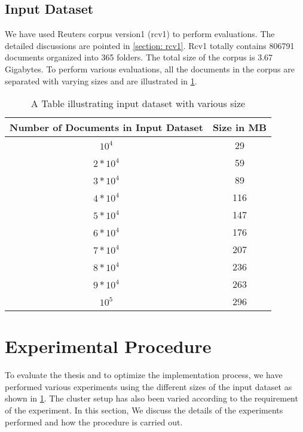 \subsection{Input Dataset}
\label{section: input dataset}
We have used Reuters corpus version1 (rcv1) to perform evaluations. The detailed discussions are pointed in \ref{section: rcv1}. Rcv1 totally contains 806791 documents organized into 365 folders. The total size of the corpus is 3.67 Gigabytes. To perform various evaluations, all the documents in the corpus are separated with varying sizes and are illustrated in \ref{tab:input dataset with various size}. 

\begin{table}[htbp]
	\centering
		\begin{tabular}{cc}\toprule
		Number of Documents in Input Dataset & Size in MB\\\midrule
		\(10^4\) & 29 \\\addlinespace 
		\(2*10^4\)  &  59 \\\addlinespace
        \(3*10^4\)  &  89 \\\addlinespace
        \(4*10^4\)  &  116 \\\addlinespace
        \(5*10^4\)  &  147 \\\addlinespace
        \(6*10^4\)  &  176 \\\addlinespace
        \(7*10^4\)  &  207 \\\addlinespace
        \(8*10^4\)  &  236 \\\addlinespace
        \(9*10^4\)  &  263 \\\addlinespace
        \(10^5\)  &  296 \\\bottomrule
		\end{tabular}
	\caption{A Table illustrating input dataset with various size}
	\label{tab:input dataset with various size}
\end{table}

\section{Experimental Procedure}
To evaluate the thesis and to optimize the implementation process, we have performed various experiments using the different sizes of the input dataset as shown in \ref{tab:input dataset with various size}. The cluster setup has also been varied according to the requirement of the experiment. In this section, We discuss the details of the experiments performed and how the procedure is carried out. 


